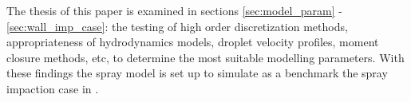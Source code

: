 \documentclass[a4paper,10pt]{article}
\begin{document}
The thesis of this paper is examined in sections \ref{sec:model_param} - \ref{sec:wall_imp_case}: the testing of high order discretization methods, appropriateness of hydrodynamics models, droplet velocity profiles, moment closure methods, etc, to determine the most suitable modelling parameters. With these findings the spray model is set up to simulate as a benchmark the spray impaction case in \cite{park2004}.

% 
% 
% 
% 
\end{document}
